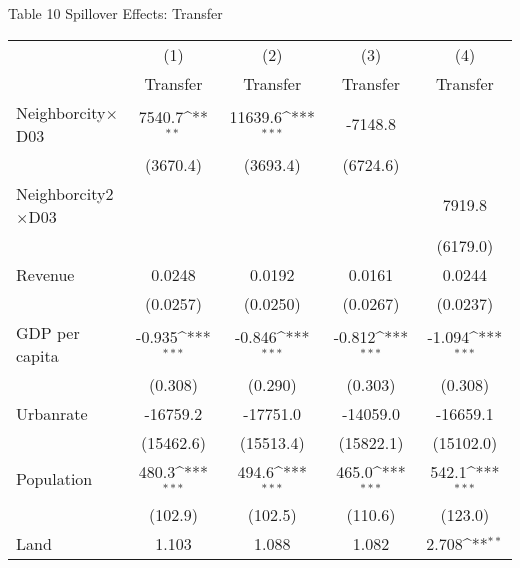 \documentclass[11pt,a4paper]{article}
\begin{document}
\begin{center}
\begin{scriptsize}
{\begin{tabular}{l*{5}{c}}
\end{tabular}
}
\end{scriptsize}
\end{center}

\newpage


\begin{center}
Table 10 Spillover Effects: Transfer \\
\medskip
\begin{scriptsize}
{
\def\sym#1{\ifmmode^{#1}\else\(^{#1}\)\fi}
\begin{tabular}{l*{4}{c}}
\hline\hline
            &\multicolumn{1}{c}{(1)}&\multicolumn{1}{c}{(2)}&\multicolumn{1}{c}{(3)}&\multicolumn{1}{c}{(4)}\\
            &\multicolumn{1}{c}{Transfer}&\multicolumn{1}{c}{Transfer}&\multicolumn{1}{c}{Transfer}&\multicolumn{1}{c}{Transfer}\\
\hline
Neighborcity\(\times\)D03        &      7540.7\sym{**}   &   11639.6\sym{***}&          -7148.8  &   \\
            &    (3670.4)         &    (3693.4)  &      (6724.6)               &      \\
[1em]
Neighborcity2\(\times\)D03    &    &    &  &    7919.8  \\
          &                   &     &      &       (6179.0)  \\
[1em]
Revenue &      0.0248         &      0.0192        &      0.0161            &        0.0244        \\
            &    (0.0257)         &    (0.0250)    &    (0.0267)         &   (0.0237)        \\
[1em]
GDP per capita &      -0.935\sym{***}&      -0.846\sym{***} &      -0.812\sym{***} &       -1.094\sym{*** }\\
            &     (0.308)         &     (0.290)     &     (0.303)         &     (0.308)         \\
[1em]
Urbanrate   &    -16759.2         &    -17751.0    &    -14059.0           &    -16659.1       \\
            &   (15462.6)         &   (15513.4)    &   (15822.1)           &    (15102.0)       \\
[1em]
Population  &       480.3\sym{***}&       494.6\sym{***}&       465.0\sym{***}&       542.1\sym{***}  \\
            &     (102.9)         &     (102.5)   &     (110.6)            &      (123.0)     \\
[1em]
Land        &       1.103         &       1.088        &       1.082       &     2.708\sym{**}     \\

\end{tabular}}
\end{scriptsize}
\end{center}
\end{document}
